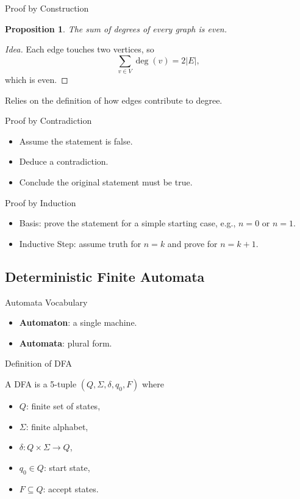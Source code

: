 \documentclass[aspectratio=169]{beamer}
\newtheorem{proposition}{Proposition}
\begin{document}
\begin{frame}{Proof by Construction}
  \begin{proposition}
    The sum of degrees of every graph is even.
  \end{proposition}
  \begin{proof}[Idea]
    Each edge touches two vertices, so
    \[
      \sum_{v \in V} \deg(v) = 2|E|,
    \]
    which is even.
  \end{proof}
  \begin{note}
    Relies on the definition of how edges contribute to degree.
  \end{note}
\end{frame}

\begin{frame}{Proof by Contradiction}
  \begin{itemize}
    \item Assume the statement is false.
    \item Deduce a contradiction.
    \item Conclude the original statement must be true.
  \end{itemize}
\end{frame}

\begin{frame}{Proof by Induction}
  \begin{itemize}
    \item Basis: prove the statement for a simple starting case, e.g., $n=0$ or $n=1$.
    \item Inductive Step: assume truth for $n=k$ and prove for $n=k+1$.
  \end{itemize}
\end{frame}

\subsection{Deterministic Finite Automata}

\begin{frame}{Automata Vocabulary}
  \begin{itemize}
    \item \textbf{Automaton}: a single machine.
    \item \textbf{Automata}: plural form.
  \end{itemize}
\end{frame}

\begin{frame}{Definition of DFA}
  \begin{definition}
    A DFA is a 5-tuple $(Q,\Sigma,\delta,q_0,F)$ where
    \begin{itemize}
      \item $Q$: finite set of states,
      \item $\Sigma$: finite alphabet,
      \item $\delta: Q \times \Sigma \to Q$,
      \item $q_0 \in Q$: start state,
      \item $F \subseteq Q$: accept states.
    \end{itemize}
  \end{definition}
\end{frame}
\end{document}

